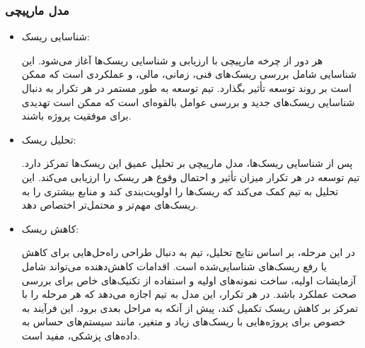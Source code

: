 \subsubsection*{مدل مارپیچی}
\begin{itemize}
    \item شناسایی ریسک: 
    
    هر دور از چرخه مارپیچی با ارزیابی و شناسایی ریسک‌ها آغاز می‌شود. این شناسایی شامل بررسی ریسک‌های فنی، زمانی، مالی، و عملکردی است که ممکن است بر روند توسعه تأثیر بگذارد. تیم توسعه به طور مستمر در هر تکرار به دنبال شناسایی ریسک‌های جدید و بررسی عوامل بالقوه‌ای است که ممکن است تهدیدی برای موفقیت پروژه باشند.
    \item تحلیل ریسک:
    
    پس از شناسایی ریسک‌ها، مدل مارپیچی بر تحلیل عمیق این ریسک‌ها تمرکز دارد. تیم توسعه در هر تکرار میزان تأثیر و احتمال وقوع هر ریسک را ارزیابی می‌کند. این تحلیل به تیم کمک می‌کند که ریسک‌ها را اولویت‌بندی کند و منابع بیشتری را به ریسک‌های مهم‌تر و محتمل‌تر اختصاص دهد.
    \item کاهش ریسک:
    
    در این مرحله، بر اساس نتایج تحلیل، تیم به دنبال طراحی راه‌حل‌هایی برای کاهش یا رفع ریسک‌های شناسایی‌شده است. اقدامات کاهش‌دهنده می‌تواند شامل آزمایشات اولیه، ساخت نمونه‌های اولیه و استفاده از تکنیک‌های خاص برای بررسی صحت عملکرد باشد. در هر تکرار، این مدل به تیم اجازه می‌دهد که هر مرحله را با تمرکز بر کاهش ریسک تکمیل کند، پیش از آنکه به مراحل بعدی برود. این فرآیند به خصوص برای پروژه‌هایی با ریسک‌های زیاد و متغیر، مانند سیستم‌های حساس به داده‌های پزشکی، مفید است.
\end{itemize}
